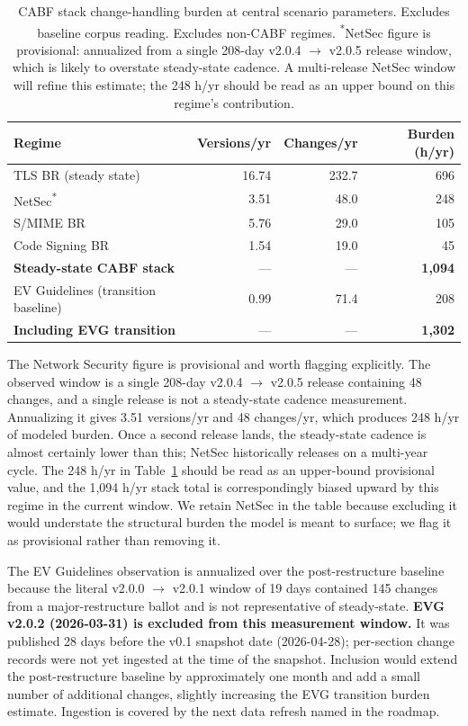 \documentclass[11pt,letterpaper]{article}
\begin{document}
\begin{table}[h]
\centering
\small
\begin{tabular}{@{}lrrr@{}}
\toprule
\textbf{Regime} & \textbf{Versions/yr} & \textbf{Changes/yr} & \textbf{Burden (h/yr)} \\
\midrule
TLS BR (steady state) & 16.74 & 232.7 & 696 \\
NetSec\textsuperscript{*} & 3.51 & 48.0 & 248 \\
S/MIME BR & 5.76 & 29.0 & 105 \\
Code Signing BR & 1.54 & 19.0 & 45 \\
\midrule
\textbf{Steady-state CABF stack} & --- & --- & \textbf{1{,}094} \\
EV Guidelines (transition baseline) & 0.99 & 71.4 & 208 \\
\textbf{Including EVG transition} & --- & --- & \textbf{1{,}302} \\
\bottomrule
\end{tabular}
\caption{CABF stack change-handling burden at central scenario parameters. Excludes baseline corpus reading. Excludes non-CABF regimes. \textsuperscript{*}NetSec figure is provisional: annualized from a single 208-day v2.0.4 $\rightarrow$ v2.0.5 release window, which is likely to overstate steady-state cadence. A multi-release NetSec window will refine this estimate; the 248 h/yr should be read as an upper bound on this regime's contribution.}
\label{tab:stack}
\end{table}

The Network Security figure is provisional and worth flagging explicitly. The observed window is a single 208-day v2.0.4 $\rightarrow$ v2.0.5 release containing 48 changes, and a single release is not a steady-state cadence measurement. Annualizing it gives 3.51 versions/yr and 48 changes/yr, which produces 248 h/yr of modeled burden. Once a second release lands, the steady-state cadence is almost certainly lower than this; NetSec historically releases on a multi-year cycle. The 248 h/yr in Table~\ref{tab:stack} should be read as an upper-bound provisional value, and the 1{,}094 h/yr stack total is correspondingly biased upward by this regime in the current window. We retain NetSec in the table because excluding it would understate the structural burden the model is meant to surface; we flag it as provisional rather than removing it.

The EV Guidelines observation is annualized over the post-restructure baseline because the literal v2.0.0 $\rightarrow$ v2.0.1 window of 19 days contained 145 changes from a major-restructure ballot and is not representative of steady-state. \textbf{EVG v2.0.2 (2026-03-31) is excluded from this measurement window.} It was published 28 days before the v0.1 snapshot date (2026-04-28); per-section change records were not yet ingested at the time of the snapshot. Inclusion would extend the post-restructure baseline by approximately one month and add a small number of additional changes, slightly increasing the EVG transition burden estimate. Ingestion is covered by the next data refresh named in the roadmap.
\end{document}

